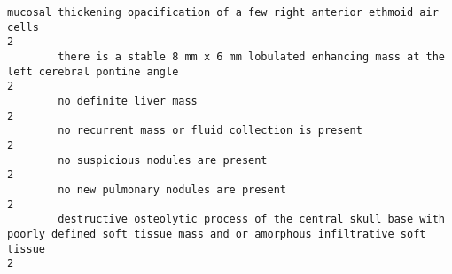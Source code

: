 \documentclass[11pt]{article}
\begin{document}
\begin{Verbatim}[commandchars=\\\{\}]
        mucosal thickening opacification of a few right anterior ethmoid air cells                                                                                                                                                                                                                                                                                                                                                      2
        there is a stable 8 mm x 6 mm lobulated enhancing mass at the left cerebral pontine angle                                                                                                                                                                                                                                                                                                                                       2
        no definite liver mass                                                                                                                                                                                                                                                                                                                                                                                                          2
        no recurrent mass or fluid collection is present                                                                                                                                                                                                                                                                                                                                                                                2
        no suspicious nodules are present                                                                                                                                                                                                                                                                                                                                                                                               2
        no new pulmonary nodules are present                                                                                                                                                                                                                                                                                                                                                                                            2
        destructive osteolytic process of the central skull base with poorly defined soft tissue mass and or amorphous infiltrative soft tissue                                                                                                                                                                                                                                                                                         2

\end{Verbatim}
\end{document}
